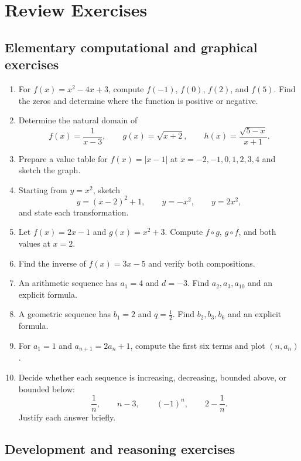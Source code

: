 \section{Review Exercises}

\subsection{Elementary computational and graphical exercises}

\begin{enumerate}
\item For $f(x)=x^2-4x+3$, compute $f(-1)$, $f(0)$, $f(2)$, and $f(5)$. Find the zeros and determine where the function is positive or negative.

\item Determine the natural domain of
\[
f(x)=\frac1{x-3},
\qquad
g(x)=\sqrt{x+2},
\qquad
h(x)=\frac{\sqrt{5-x}}{x+1}.
\]

\item Prepare a value table for $f(x)=|x-1|$ at $x=-2,-1,0,1,2,3,4$ and sketch the graph.

\item Starting from $y=x^2$, sketch
\[
y=(x-2)^2+1,
\qquad
y=-x^2,
\qquad
y=2x^2,
\]
and state each transformation.

\item Let $f(x)=2x-1$ and $g(x)=x^2+3$. Compute $f\circ g$, $g\circ f$, and both values at $x=2$.

\item Find the inverse of $f(x)=3x-5$ and verify both compositions.

\item An arithmetic sequence has $a_1=4$ and $d=-3$. Find $a_2,a_3,a_{10}$ and an explicit formula.

\item A geometric sequence has $b_1=2$ and $q=\frac12$. Find $b_2,b_3,b_6$ and an explicit formula.

\item For $a_1=1$ and $a_{n+1}=2a_n+1$, compute the first six terms and plot $(n,a_n)$.

\item Decide whether each sequence is increasing, decreasing, bounded above, or bounded below:
\[
\frac1n,
\qquad n-3,
\qquad(-1)^n,
\qquad2-\frac1n.
\]
Justify each answer briefly.
\end{enumerate}

\subsection{Development and reasoning exercises}

